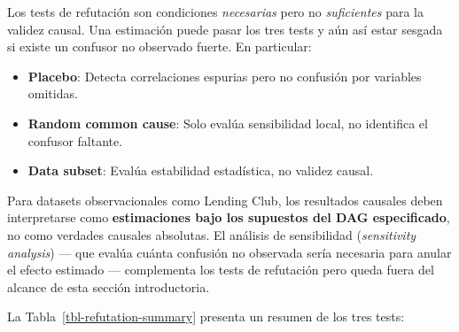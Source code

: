 \documentclass[
  spanish,
  11pt,
  letterpaper,
]{scrbook}
\providecommand{\tightlist}{%
  \setlength{\itemsep}{0pt}\setlength{\parskip}{0pt}}
\theoremstyle{plain}
\theoremstyle{remark}
\begin{document}
\begin{tcolorbox}[enhanced jigsaw, arc=.35mm, bottomrule=.15mm, bottomtitle=1mm, breakable, colback=white, colbacktitle=quarto-callout-warning-color!10!white, colframe=quarto-callout-warning-color-frame, coltitle=black, left=2mm, leftrule=.75mm, opacityback=0, opacitybacktitle=0.6, rightrule=.15mm, title=\textcolor{quarto-callout-warning-color}{\faExclamationTriangle}\hspace{0.5em}{Limitaciones de los tests de refutación}, titlerule=0mm, toprule=.15mm, toptitle=1mm]

Los tests de refutación son condiciones \emph{necesarias} pero no
\emph{suficientes} para la validez causal. Una estimación puede pasar
los tres tests y aún así estar sesgada si existe un confusor no
observado fuerte. En particular:

\begin{itemize}
\tightlist
\item
  \textbf{Placebo}: Detecta correlaciones espurias pero no confusión por
  variables omitidas.
\item
  \textbf{Random common cause}: Solo evalúa sensibilidad local, no
  identifica el confusor faltante.
\item
  \textbf{Data subset}: Evalúa estabilidad estadística, no validez
  causal.
\end{itemize}

Para datasets observacionales como Lending Club, los resultados causales
deben interpretarse como \textbf{estimaciones bajo los supuestos del DAG
especificado}, no como verdades causales absolutas. El análisis de
sensibilidad (\emph{sensitivity analysis}) --- que evalúa cuánta
confusión no observada sería necesaria para anular el efecto estimado
--- complementa los tests de refutación pero queda fuera del alcance de
esta sección introductoria.

\end{tcolorbox}

La Tabla~\ref{tbl-refutation-summary} presenta un resumen de los tres
tests:
\end{document}
